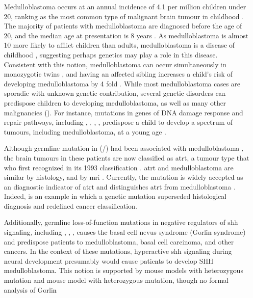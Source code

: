 Medulloblastoma occurs at an annual incidence of 4.1 per million children under 20, ranking as the most common type of malignant brain tumour in childhood . The majority of patients with medulloblastoma are diagnosed before the age of 20, and the median age at presentation is 8 years . As medulloblastoma is almost 10 more likely to afflict children than adults, medulloblastoma is a disease of childhood , suggesting perhaps genetics may play a role in this disease. Consistent with this notion, medulloblastoma can occur simultaneously in monozygotic twins , and having an affected sibling increases a child's risk of developing medulloblastoma by 4 fold . While most medulloblastoma cases are sporadic with unknown genetic contribution, several genetic disorders can predispose children to developing medulloblastoma, as well as many other malignancies (). For instance, mutations in genes of DNA damage response and repair pathways, including , , , , predispose a child to develop a spectrum of tumours, including medulloblastoma, at a young age . 

Although germline mutation in  (/) had been associated with medulloblastoma , the brain tumours in these patients are now classified as \gls{atrt}, a tumour type that \gls{who} first recognized in its 1993 classification . \gls{atrt} and medulloblastoma are similar by histology, and by \gls{mri} . Currently, the  mutation is widely accepted as an diagnostic indicator of \gls{atrt} and distinguishes \gls{atrt} from medulloblastoma . Indeed,  is an example in which a genetic mutation superseded histological diagnosis and redefined cancer classification.

Additionally, germline loss-of-function mutations in negative regulators of \gls{shh} signaling, including , , , causes the basal cell nevus syndrome (Gorlin syndrome) and predispose patients to medulloblastoma, basal cell carcinoma, and other cancers. In the context of these mutations, hyperactive \gls{shh} signaling during neural development presumably would cause patients to develop SHH medulloblastoma. This notion is supported by mouse models with heterozygous  mutation  and mouse model with heterozygous  mutation, though no formal analysis of Gorlin


